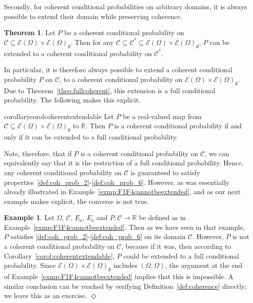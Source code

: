 \documentclass[10pt,a4paper]{paper}
\theoremstyle{definition}
\newtheorem{exmp}{Example}
\newtheorem{theorem}{Theorem}[section]
\newcommand{\reals}{\mathbb{R}}
\newcommand{\paths}{\Omega}
\newcommand{\power}{\mathcal{E}(\paths)}
\newcommand{\nonemptypower}{\power_{\emptyset}}
\newcommand{\exampleend}{\hfill$\Diamond$}
\begin{document}
Secondly, for coherent conditional probabilities on arbitrary domains, it is always possible to extend their domain while preserving coherence.

\begin{theorem}{\cite[Theorem 4]{regazzini1985finitely}}\label{theo:largerdomain}
Let $P$ be a coherent conditional probability on $\mathcal{C}\subseteq\power\times\nonemptypower$. Then for any $\mathcal{C}\subseteq\mathcal{C}^*\subseteq\power\times\nonemptypower$, $P$ can be extended to a coherent conditional probability on $\mathcal{C}^*$.
\end{theorem}
In particular, it is therefore always possible to extend a coherent conditional probability $P$ on $\mathcal{C}$, to a coherent conditional probability on $\power\times\nonemptypower$. Due to Theorem~\ref{theo:fullcoherent}, this extension is a full conditional probability. The following makes this explicit.

\begin{restatable}{corollary}{corolcoherentextendable}
\label{corol:coherentextendable}
Let $P$ be a real-valued map from $\mathcal{C}\subseteq\power\times\nonemptypower$ to $\reals$. Then $P$ is a coherent conditional probability if and only if it can be extended to a full conditional probability.
\end{restatable}
Note, therefore, that if $P$ is a coherent conditional probability on $\mathcal{C}$, we can equivalently say that it is the restriction of a full conditional probability. Hence, any coherent conditional probability on $\mathcal{C}$ is guaranteed to satisfy properties~\ref{def:coh_prob_2}-\ref{def:coh_prob_6}. However, as was essentially already illustrated in Example~\ref{exmp:F1F4cannotbeextended}, and as our next example makes explicit, the converse is not true.

\begin{exmp}
Let $\Omega$, $\mathcal{C}$, $E_{\mathrm{o}}$, $E_{\mathrm{e}}$ and $P\colon\mathcal{C}\to\reals$ be defined as in Example~\ref{exmp:F1F4cannotbeextended}. Then as we have seen in that example, $P$ satisfies \ref{def:coh_prob_2}-\ref{def:coh_prob_6} on its domain $\mathcal{C}$. However, $P$ is not a coherent conditional probability on $\mathcal{C}$, because if it was, then according to Corollary~\ref{corol:coherentextendable}, $P$ could be extended to a full conditional probability. Since $\power\times\nonemptypower$ includes $(\Omega,\Omega)$, the argument at the end of Example~\ref{exmp:F1F4cannotbeextended} implies that this is impossible.
A similar conclusion can be reached by verifying Definition~\ref{def:coherence} directly; we leave this as an exercise.
\exampleend
\end{exmp}
\end{document}
